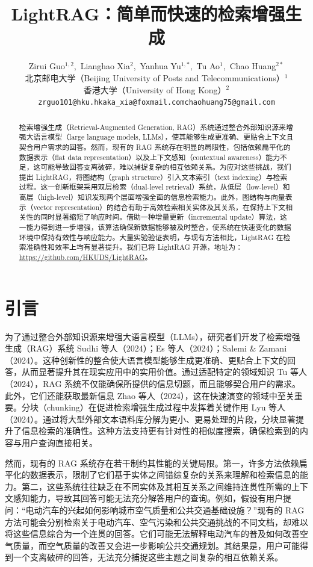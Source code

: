 \documentclass[11pt,UTF8,fontset=fandol]{ctexart}
\title{\textbf{LightRAG：简单而快速的检索增强生成}}
\author{Zirui Guo$^{1,2}$,~Lianghao Xia$^{2}$,~Yanhua Yu$^{1,*}$,~Tu Ao$^{1}$,~Chao Huang$^{2*}$\\[0.4em]
北京邮电大学（Beijing University of Posts and Telecommunications）$^{1}$\\
香港大学（University of Hong Kong）$^{2}$\\[0.3em]
\texttt{zrguo101@hku.hk\quad aka\_xia@foxmail.com\quad chaohuang75@gmail.com}}
\date{}
\begin{document}
\maketitle

\renewcommand{\thefootnote}{\arabic{footnote}}

\begin{abstract}
检索增强生成（Retrieval-Augmented Generation, RAG）系统通过整合外部知识源来增强大语言模型（large language models, LLMs），使其能够生成更准确、更贴合上下文且契合用户需求的回答。然而，现有的 RAG 系统存在明显的局限性，包括依赖扁平化的数据表示（flat data representation）以及上下文感知（contextual awareness）能力不足，这可能导致回答支离破碎，难以捕捉复杂的相互依赖关系。为应对这些挑战，我们提出 LightRAG，将图结构（graph structure）引入文本索引（text indexing）与检索过程。这一创新框架采用双层检索（dual-level retrieval）系统，从低层（low-level）和高层（high-level）知识发现两个层面增强全面的信息检索能力。此外，图结构与向量表示（vector representation）的结合有助于高效检索相关实体及其关系，在保持上下文相关性的同时显著缩短了响应时间。借助一种增量更新（incremental update）算法，这一能力得到进一步增强，该算法确保新数据能够被及时整合，使系统在快速变化的数据环境中保持有效性与响应能力。大量实验验证表明，与现有方法相比，LightRAG 在检索准确性和效率上均有显著提升。我们已将 LightRAG 开源，地址为：\url{https://github.com/HKUDS/LightRAG}。
\end{abstract}

\section{引言}

为了通过整合外部知识源来增强大语言模型（LLMs），研究者们开发了检索增强生成（RAG）系统 Sudhi 等人（2024）；Es 等人（2024）；Salemi \& Zamani（2024）。这种创新性的整合使大语言模型能够生成更准确、更贴合上下文的回答，从而显著提升其在现实应用中的实用价值。通过适配特定的领域知识 Tu 等人（2024），RAG 系统不仅能确保所提供的信息切题，而且能够契合用户的需求。此外，它们还能获取最新信息 Zhao 等人（2024），这在快速演变的领域中至关重要。分块（chunking）在促进检索增强生成过程中发挥着关键作用 Lyu 等人（2024）。通过将大型外部文本语料库分解为更小、更易处理的片段，分块显著提升了信息检索的准确性。这种方法支持更有针对性的相似度搜索，确保检索到的内容与用户查询直接相关。

然而，现有的 RAG 系统存在若干制约其性能的关键局限。第一，许多方法依赖扁平化的数据表示，限制了它们基于实体之间错综复杂的关系来理解和检索信息的能力。第二，这些系统往往缺乏在不同实体及其相互关系之间维持连贯性所需的上下文感知能力，导致其回答可能无法充分解答用户的查询。例如，假设有用户提问：“电动汽车的兴起如何影响城市空气质量和公共交通基础设施？”现有的 RAG 方法可能会分别检索关于电动汽车、空气污染和公共交通挑战的不同文档，却难以将这些信息综合为一个连贯的回答。它们可能无法解释电动汽车的普及如何改善空气质量，而空气质量的改善又会进一步影响公共交通规划。其结果是，用户可能得到一个支离破碎的回答，无法充分捕捉这些主题之间复杂的相互依赖关系。
\end{document}
